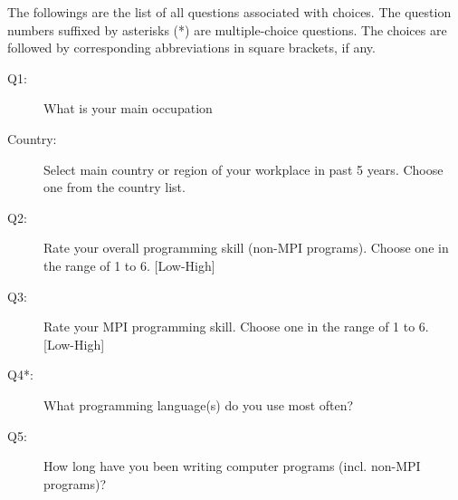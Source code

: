 \documentclass[preprint,5p,times]{elsarticle}
\begin{document}
The followings are the list of all questions associated with
choices. The question numbers suffixed by asterisks (*) are
multiple-choice questions. The choices are followed by corresponding
abbreviations in square brackets, if any.
\vspace{2mm}
{\footnotesize
  \begin{description}
  \item[Q1:] What is your main occupation
  \item[Country:] \hspace{3mm}Select main country or region of your workplace in past 5 years.
    Choose one from the country list.
  \item[Q2:] Rate your overall programming skill (non-MPI programs).
    Choose one in the range of 1 to 6. [Low-High]
  \item[Q3:] Rate your MPI programming skill.
    Choose one in the range of 1 to 6. [Low-High]
  \item[Q4*:] What programming language(s) do you use most often?
  \item[Q5:] How long have you been writing computer programs (incl. non-MPI programs)?
\end{description}}
\end{document}
